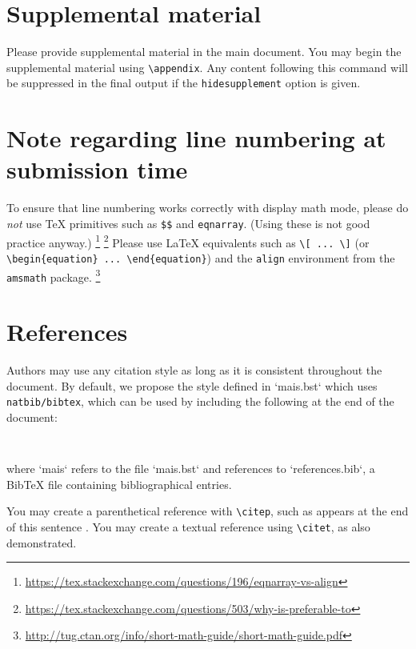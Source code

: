 \documentclass[11pt]{article}
\begin{document}
\section{Supplemental material}

Please provide supplemental material in the main document. You may begin the supplemental material using \verb|\appendix|. Any content following this command will be suppressed in the final output if the \texttt{hidesupplement} option is given.

\section{Note regarding line numbering at submission time}

To ensure that line numbering works correctly with display math mode, please do \emph{not} use \TeX{} primitives such as \verb|$$| and \texttt{eqnarray}.  (Using these is not good practice anyway.)%
%
\footnote{\url{https://tex.stackexchange.com/questions/196/eqnarray-vs-align}}%
\footnote{\url{https://tex.stackexchange.com/questions/503/why-is-preferable-to}}
%
Please use \LaTeX{} equivalents such as \verb|\[ ... \]| (or \verb|\begin{equation} ... \end{equation}|) and the \texttt{align} environment from the \texttt{amsmath} package.%
%
\footnote{\url{http://tug.ctan.org/info/short-math-guide/short-math-guide.pdf}}

\section{References}

Authors may use any citation style as long as it is consistent throughout the
document. By default, we propose the style defined in `mais.bst` which uses \texttt{natbib/bibtex}, which can be used by including the following at the end of the document:

\begin{verbatim}


\end{verbatim}

where `mais` refers to the file `mais.bst` and references to `references.bib`, a BibTeX file containing bibliographical entries.

You may create a parenthetical reference with \verb|\citep|, such as appears at the end of this sentence \citep{mitchell2003venus}. You may create a textual reference using \verb|\citet|, as \citet{mitchell2003venus} also demonstrated.
\end{document}
